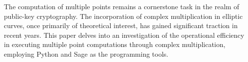 The computation of multiple points remains a cornerstone task in the realm of public-key cryptography. The incorporation of complex multiplication in elliptic curves, once primarily of theoretical interest, has gained significant traction in recent years. This paper delves into an investigation of the operational efficiency in executing multiple point computations through complex multiplication, employing Python and Sage as the programming tools.